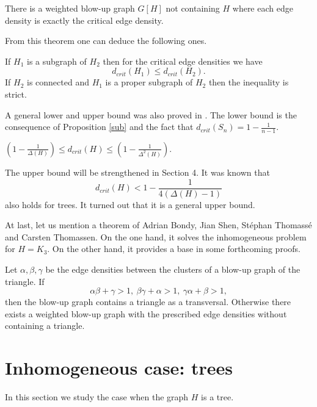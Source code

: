 \documentclass[12pt,a4paper]{amsart}
\numberwithin{equation}{section}
\begin{document}
\begin{theorem} {\rm \cite{nagy1}} There is a weighted
  blow-up graph $G[H]$ not containing $H$  where each edge density is exactly
  the critical edge density. 
\end{theorem}

From this theorem one can deduce the following ones.

\begin{prop} {\rm \cite{nagy1}}\label{sub} If $H_1$ is a subgraph of
  $H_2$ then for the critical edge densities we have
$$d_{crit}(H_1)\leq d_{crit}(H_2).$$
If $H_2$ is connected and  $H_1$ is a proper subgraph of $H_2$ then the
inequality is strict.
\end{prop}

A general lower and upper bound was also proved in \cite{nagy1}. The lower
bound is the consequence of Proposition \ref{sub} and the fact that
$d_{crit}(S_n)=1-\frac{1}{n-1}$.  

\begin{prop} \label{becsles}
$(1-\frac{1}{\Delta(H)})\leq d_{crit}(H)\leq (1-\frac{1}{\Delta^2(H)})$.
\end{prop} 

The upper bound will be strengthened in Section 4. It was known that
$$d_{crit}(H)<1-\frac{1}{4(\Delta(H)-1)}$$ also holds for trees. It turned out
that it is a general upper bound. 
\medskip

At last, let us mention a theorem of Adrian Bondy, Jian Shen, St\'ephan
Thomass\'e and Carsten Thomassen. On the one hand, it solves the inhomogeneous
problem for $H=K_3$. On the other hand, it provides a base in some forthcoming
proofs. 

\begin{lemma} {\rm \cite{bond}}\label{triangle1} 
 Let $\alpha, \beta,\gamma$ be the edge densities between the clusters of a
 blow-up graph of the triangle. 
If 
$$\alpha \beta+\gamma>1,\ \beta\gamma+\alpha>1,\ \gamma\alpha+\beta>1,$$
then the blow-up graph contains a triangle as a transversal. Otherwise there
exists a weighted blow-up graph with the prescribed edge densities without
containing a triangle. 
\end{lemma}

\section{Inhomogeneous case: trees } 

In this section we study the case when the graph $H$ is a tree.
\end{document}
